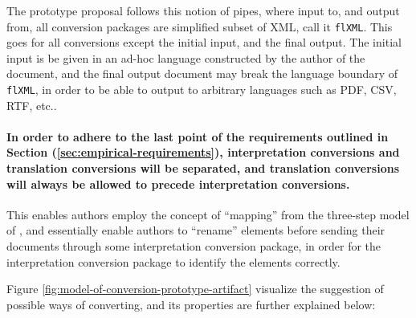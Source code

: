 \documentclass{scrreprt}
\begin{document}
The prototype proposal follows this notion of pipes, where input to, and output from, all conversion packages are simplified subset of XML, call it \texttt{flXML}. This goes for all conversions except the initial input, and the final output. The initial input is be given in an ad-hoc language constructed by the author of the document, and the final output document may break the language boundary of \texttt{flXML}, in order to be able to output to arbitrary languages such as PDF, CSV, RTF, etc..


\paragraph{In order to adhere to the last point of the requirements outlined in Section (\ref{sec:empirical-requirements}), interpretation conversions and translation conversions will be separated, and translation conversions will always be allowed to precede interpretation conversions.} This enables authors employ the concept of ``mapping'' from the three-step model of \citet{goldfarb}, and essentially enable authors to ``rename'' elements before sending their documents through some interpretation conversion package, in order for the interpretation conversion package to identify the elements correctly.

Figure \ref{fig:model-of-conversion-prototype-artifact} visualize the suggestion of possible ways of converting, and its properties are further explained below:
\end{document}
